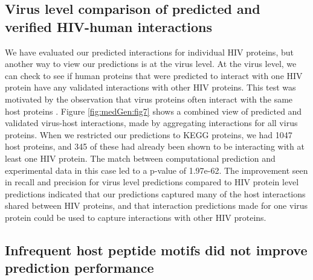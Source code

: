 \subsection{Virus level comparison of predicted and verified HIV-human interactions}

We have evaluated our predicted interactions for individual HIV
proteins, but another way to view our predictions is at the virus
level. At the virus level, we can check to see if human proteins that
were predicted to interact with one HIV protein have any validated
interactions with other HIV proteins. This test was motivated by the
observation that virus proteins often interact with the same host
proteins \cite{ptak08}. Figure \ref{fig:medGen:fig7} shows a combined
view of predicted and validated virus-host interactions, made by
aggregating interactions for all virus proteins. When we restricted
our predictions to KEGG proteins, we had 1047 host proteins, and 345
of these had already been shown to be interacting with at least one
HIV protein. The match between computational prediction and
experimental data in this case led to a p-value of 1.97e-62. The
improvement seen in recall and precision for virus level predictions
compared to HIV protein level predictions indicated that our
predictions captured many of the host interactions shared between HIV
proteins, and that interaction predictions made for one virus protein
could be used to capture interactions with other HIV proteins.


\subsection{Infrequent host peptide motifs did not improve prediction performance}

